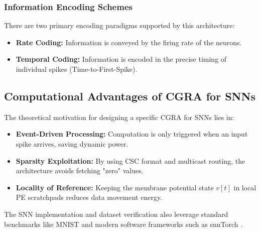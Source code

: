 \subsubsection{Information Encoding Schemes}
There are two primary encoding paradigms supported by this architecture:
\begin{itemize}
    \item \textbf{Rate Coding:} Information is conveyed by the firing rate of the neurons.
    \item \textbf{Temporal Coding:} Information is encoded in the precise timing of individual spikes (Time-to-First-Spike).
\end{itemize}

\subsection{Computational Advantages of CGRA for SNNs}
The theoretical motivation for designing a specific CGRA for SNNs lies in:
\begin{itemize}
    \item \textbf{Event-Driven Processing:} Computation is only triggered when an input spike arrives, saving dynamic power.
    \item \textbf{Sparsity Exploitation:} By using CSC format and multicast routing, the architecture avoids fetching "zero" values.
    \item \textbf{Locality of Reference:} Keeping the membrane potential state $v[t]$ in local PE scratchpads reduces data movement energy.
\end{itemize}

The SNN implementation and dataset verification also leverage standard benchmarks like MNIST \cite{lecun1998gradient} and modern software frameworks such as snnTorch \cite{snntorch2021}.

